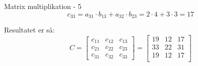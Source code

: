 \documentclass{article}
\begin{document}
\begin{exercise}{Matrix multiplikation - 5}
\hint
\[
c_{33} = a_{31} \cdot b_{13} + a_{32} \cdot b_{23} = 2 \cdot 4 + 3 \cdot 3 = 17
\]



\hint
Resultatet er så:
\[
C = \left[\begin{array}{rrr}
c_{11} & c_{12} & c_{13} \\
c_{21} & c_{22} & c_{23} \\
c_{31} & c_{32} & c_{33}
\end{array} \right] =
\left[\begin{array}{rrr}
19 & 12 & 17 \\
33 & 22 & 31 \\
19 & 12 & 17 \\
\end{array} \right]
\]


\end{exercise}

\newpage
\end{document}
